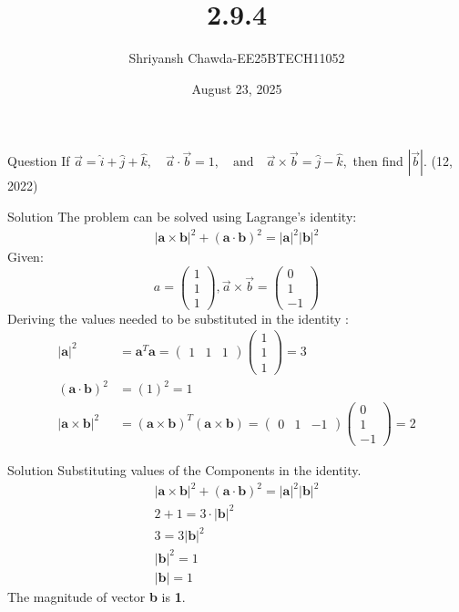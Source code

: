 \documentclass{beamer}
\title{2.9.4}
\author{Shriyansh Chawda-EE25BTECH11052}
\date{August 23, 2025}
\newcommand{\myvec}[1]{\ensuremath{\begin{pmatrix}#1\end{pmatrix}}}
\begin{document}
	

		\frame{\titlepage}
	
	
	

	\begin{frame}{Question} 
If   $\vec{a} = \hat{i} + \hat{j} + \hat{k}, \quad \vec{a} \cdot \vec{b} = 1, \quad \text{and} \quad \vec{a} \times \vec{b} = \hat{j} - \hat{k},$ then find \textbf{$|\vec{b}|$}.
\hfill (12, 2022)
	\end{frame}
	
\begin{frame}{Solution}
The problem can be solved using Lagrange's identity:
\begin{align}
	|\mathbf{a} \times \mathbf{b}|^2 + (\mathbf{a} \cdot \mathbf{b})^2 = |\mathbf{a}|^2 |\mathbf{b}|^2 
\end{align}
Given:
\[
a=\myvec{1\\1\\1} ,
\vec{a} \times \vec{b} = \myvec{0 \\ 1 \\ -1}
\]
Deriving the values needed to be substituted in the identity :
\begin{align}
	|\mathbf{a}|^2 &= \mathbf{a}^T \mathbf{a} = \myvec{1 & 1 & 1}\myvec{1\\1\\1} = 3 \\ 
	(\mathbf{a} \cdot \mathbf{b})^2 &= (1)^2 = 1 \\
	|\mathbf{a} \times \mathbf{b}|^2 &= (\mathbf{a} \times \mathbf{b})^T (\mathbf{a} \times \mathbf{b}) = \myvec{0 & 1 & -1}\myvec{0\\1\\-1} = 2
\end{align}

\end{frame}

\begin{frame}{Solution}
Substituting values of the Components in the identity.
\begin{align}
	|\mathbf{a} \times \mathbf{b}|^2 + (\mathbf{a} \cdot \mathbf{b})^2 = |\mathbf{a}|^2 |\mathbf{b}|^2 \\
	2 + 1 = 3 \cdot |\mathbf{b}|^2 \\
	3 = 3 |\mathbf{b}|^2 \\
	|\mathbf{b}|^2 = 1 \\
	|\mathbf{b}| = 1
\end{align}
The magnitude of vector \textbf{b} is \textbf{1}.		
\end{frame}
\end{document}
